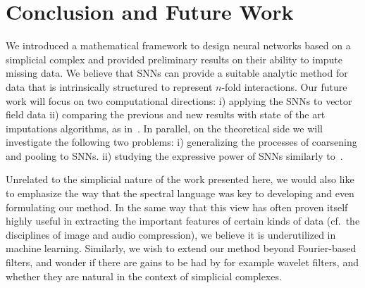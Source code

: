 \section{Conclusion and Future Work}

We introduced a mathematical framework to design neural networks based on a simplicial complex and provided preliminary results on their ability to impute missing data.
We believe that SNNs can provide a suitable analytic method for data that is intrinsically structured to represent $n$-fold interactions.
Our future work will focus on two computational directions:  i) applying the SNNs to vector field data ii) comparing the previous and new results with state of the art imputations algorithms, as in~\cite{spinelli2020neural}.
In parallel, on the theoretical side we will investigate the following two problems: i) generalizing the processes of coarsening and pooling to SNNs. ii) studying the expressive power of SNNs similarly to~\cite{morris2019weisfeiler}. 

Unrelated to the simplicial nature of the work presented here, we would also like to emphasize the way that the spectral language was key to developing and even formulating our method. In the same way that this view has often proven itself highly useful in extracting the important features of certain kinds of data (cf.\ the disciplines of image and audio compression), we believe it is underutilized in machine learning.
Similarly, we wish to extend our method beyond Fourier-based filters, and wonder if there are gains to be had by for example wavelet filters, and whether they are natural in the context of simplicial complexes.
